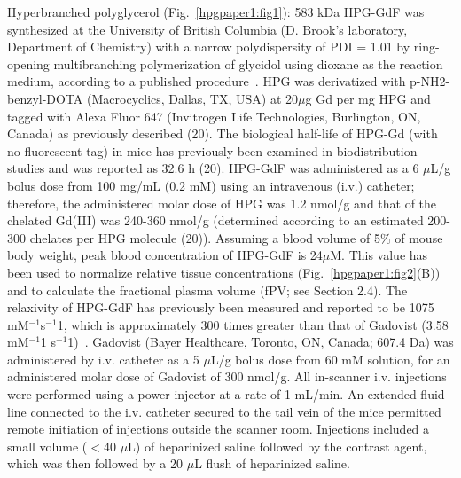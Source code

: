 Hyperbranched polyglycerol (Fig.~\ref{hpgpaper1:fig1}): 583 \acs{kDa} \acs{HPG-GdF} was synthesized at the University of British Columbia (D. Brook's laboratory, Department of Chemistry) with a narrow polydispersity of PDI = 1.01 by ring-opening multibranching polymerization of glycidol using dioxane as the reaction medium, according to a published procedure~\cite{Kainthan:2006ce}.
HPG was derivatized with p-NH2-benzyl-DOTA (Macrocyclics, Dallas, TX, USA) at 20$\mu$g Gd per mg HPG and tagged with Alexa Fluor 647 (Invitrogen Life Technologies, Burlington, ON, Canada) as previously described (20).
The biological half-life of HPG-Gd (with no fluorescent tag) in mice has previously been examined in biodistribution studies and was reported as 32.6 h (20).
HPG-GdF was administered as a 6 $\mu$L/g bolus dose from 100 mg/mL (0.2 mM) using an intravenous (i.v.) catheter; therefore, the administered molar dose of HPG was 1.2 nmol/g and that of the chelated Gd(III) was 240-360 nmol/g (determined according to an estimated 200-300 chelates per HPG molecule (20)).
Assuming a blood volume of 5\% of mouse body weight, peak blood concentration of \acs{HPG-GdF} is 24$\mu$M.
This value has been used to normalize relative tissue concentrations (Fig.~\ref{hpgpaper1:fig2}(B)) and to calculate the fractional plasma volume (fPV; see Section 2.4).
The relaxivity of \acs{HPG-GdF} has previously been measured and reported to be 1075 mM$^{-1}$s$^{-1}$1, which is approximately 300 times greater than that of Gadovist (3.58 mM$^{-1}$1 s$^{-1}$1)~\cite{Saatchi:2012hc}.
Gadovist (Bayer Healthcare, Toronto, ON, Canada; 607.4 \acs{Da}) was administered by i.v. catheter as a 5 $\mu$L/g bolus dose from 60 mM solution, for an administered molar dose of Gadovist of 300 nmol/g.
All in-scanner i.v. injections were performed using a power injector at a rate of 1 mL/min.
An extended fluid line connected to the i.v. catheter secured to the tail vein of the mice permitted remote initiation of injections outside the scanner room.
Injections included a small volume ($<$40 $\mu$L) of heparinized saline followed by the contrast agent, which was then followed by a 20 $\mu$L flush of heparinized saline.

